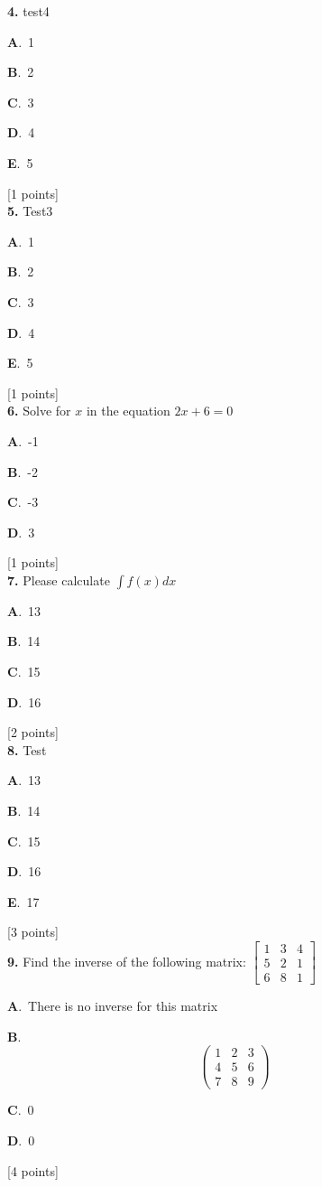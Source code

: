 \documentclass[12pt]{article}
\newcommand{\choice}[3]{%
  \noindent\textbf{#1}.~#2\hfill#3\par\vspace{0.25em}
}
\begin{document}
\noindent \textbf{\textenglish{4.}} {\textenglish{test4}}

\noindent\choice{A}{{\textenglish{1}}}{}
\noindent\choice{B}{{\textenglish{2}}}{}
\noindent\choice{C}{{\textenglish{3}}}{}
\noindent\choice{D}{{\textenglish{4}}}{}
\noindent\choice{E}{{\textenglish{5}}}{}
\hfill {\textenglish{[1 points]}}\\[0.5em]

\noindent \textbf{\textenglish{5.}} {\textenglish{Test3}}

\noindent\choice{A}{{\textenglish{1}}}{}
\noindent\choice{B}{{\textenglish{2}}}{}
\noindent\choice{C}{{\textenglish{3}}}{}
\noindent\choice{D}{{\textenglish{4}}}{}
\noindent\choice{E}{{\textenglish{5}}}{}
\hfill {\textenglish{[1 points]}}\\[0.5em]

\noindent \textbf{\textenglish{6.}} {\textenglish{Solve for }}\(x \){\textenglish{ in the equation }}\(2x+6 = 0 \)

\noindent\choice{A}{{\textenglish{-1}}}{}
\noindent\choice{B}{{\textenglish{-2}}}{}
\noindent\choice{C}{{\textenglish{-3}}}{}
\noindent\choice{D}{{\textenglish{3}}}{}
\hfill {\textenglish{[1 points]}}\\[0.5em]

\noindent \textbf{\textenglish{7.}} {\textenglish{Please calculate }}\(\int f(x)dx\)

\noindent\choice{A}{{\textenglish{13}}}{}
\noindent\choice{B}{{\textenglish{14}}}{}
\noindent\choice{C}{{\textenglish{15}}}{}
\noindent\choice{D}{{\textenglish{16}}}{}
\hfill {\textenglish{[2 points]}}\\[0.5em]

\noindent \textbf{\textenglish{8.}} {\textenglish{Test}}

\noindent\choice{A}{{\textenglish{13}}}{}
\noindent\choice{B}{{\textenglish{14}}}{}
\noindent\choice{C}{{\textenglish{15}}}{}
\noindent\choice{D}{{\textenglish{16}}}{}
\noindent\choice{E}{{\textenglish{17}}}{}
\hfill {\textenglish{[3 points]}}\\[0.5em]

\noindent \textbf{\textenglish{9.}} {\textenglish{Find the inverse of the following matrix: }}\(\begin{bmatrix} 1 & 3 & 4 \\ 5 & 2 & 1 \\ 6 & 8 & 1 \end{bmatrix}\)

\noindent\choice{A}{{\textenglish{There is no inverse for this matrix}}}{}
\noindent\choice{B}{\[\begin{pmatrix} 1 & 2 & 3 \\ 4 & 5 & 6 \\ 7 & 8 & 9  \end{pmatrix}\]}{}
\noindent\choice{C}{{\textenglish{0}}}{}
\noindent\choice{D}{{\textenglish{0}}}{}
\hfill {\textenglish{[4 points]}}\\[0.5em]
\end{document}
